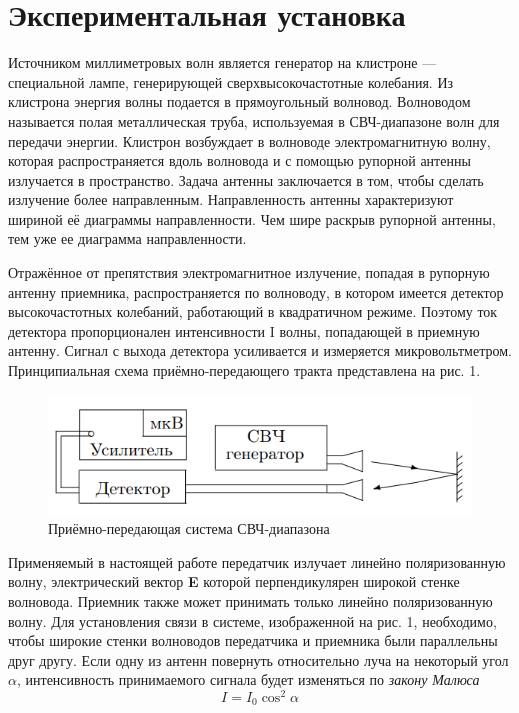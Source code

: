 \documentclass[a4paper]{article}
\begin{document}
\section{Экспериментальная установка}
Источником миллиметровых волн является генератор на клистроне — специальной лампе, генерирующей сверхвысокочастотные колебания. Из клистрона энергия волны подается в прямоугольный волновод. Волноводом называется полая металлическая труба, используемая в СВЧ-диапазоне волн для передачи энергии. Клистрон возбуждает в волноводе
электромагнитную волну, которая распространяется вдоль волновода и с помощью рупорной антенны излучается в пространство. Задача антенны заключается в том, чтобы сделать излучение более направленным. Направленность антенны характеризуют шириной её диаграммы направленности. Чем шире раскрыв рупорной
антенны, тем уже ее диаграмма направленности. \par
Отражённое от препятствия электромагнитное излучение, попадая в рупорную антенну приемника, распространяется по волноводу, в котором имеется детектор высокочастотных колебаний,
работающий в квадратичном режиме. Поэтому ток детектора пропорционален интенсивности I волны, попадающей в приемную антенну. Сигнал с выхода детектора усиливается и измеряется микровольтметром. Принципиальная схема приёмно-передающего тракта представлена на рис. 1.

\begin{figure}[h]
    \centering
    \includegraphics[width=12cm]{fig1.PNG}
    \caption{Приёмно-передающая система СВЧ-диапазона}
    \label{fig:vac}
\end{figure}

Применяемый в настоящей работе передатчик излучает линейно поляризованную волну, электрический вектор \textbf{E} которой перпендикулярен широкой стенке волновода. Приемник также может принимать только линейно поляризованную волну. Для установления связи в системе, изображенной на рис. 1, необходимо, чтобы широкие стенки волноводов передатчика и приемника были параллельны друг другу.
Если одну из антенн повернуть относительно луча на некоторый угол $\alpha$, интенсивность принимаемого сигнала будет изменяться по \textit{закону Малюса}
\begin{equation}
    I = I_0 \cos^2 \alpha
\end{equation}
\end{document}
